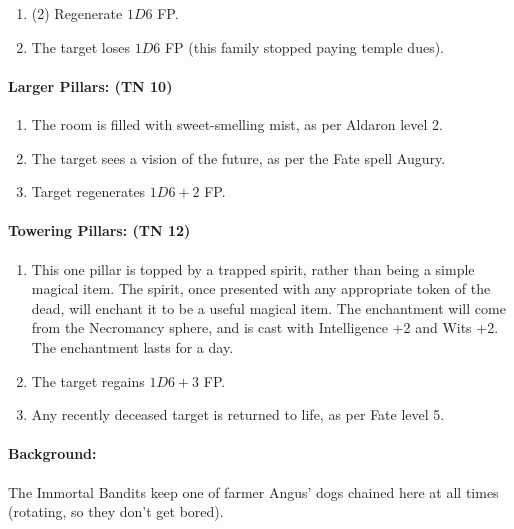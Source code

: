 \begin{multicols}{2}
\begin{enumerate}
  \item{(2) Regenerate $1D6$ FP.}
  \item{The target loses $1D6$ FP (this family stopped paying temple dues).}
\end{enumerate}

\paragraph{Larger Pillars: (TN 10)}

\begin{enumerate}

  \item{The room is filled with sweet-smelling mist, as per Aldaron level 2.}
  \item{The target sees a vision of the future, as per the Fate spell Augury.}
  \item{Target regenerates $1D6+2$ FP.}
\end{enumerate}

\paragraph{Towering Pillars: (TN 12)}

\begin{enumerate}

  \item{This one pillar is topped by a trapped spirit, rather than being a simple magical item.  The spirit, once presented with any appropriate token of the dead, will enchant it to be a useful magical item.  The enchantment will come from the Necromancy sphere, and is cast with Intelligence +2 and Wits +2.  The enchantment lasts for a day.}
  \item{The target regains $1D6+3$ FP.}
  \item{Any recently deceased target is returned to life, as per Fate level 5.}

\end{enumerate}


\paragraph{Background:}
The Immortal Bandits keep one of farmer Angus' dogs chained here at all times (rotating, so they don't get bored).

\begin{boxtext}


\end{boxtext}
\end{multicols}
